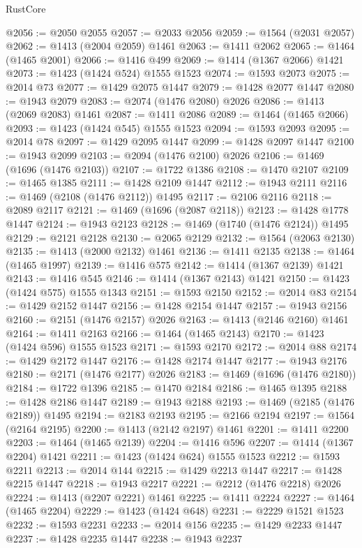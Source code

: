 \begin{lexlean}{RustCore}
\begin{coremodule}
@2056 := @2050 @2055
@2057 := @2033 @2056
@2059 := @1564 (@2031 @2057)
@2062 := @1413 (@2004 @2059) @1461
@2063 := @1411 @2062
@2065 := @1464 (@1465 @2001)
@2066 := @1416 @499
@2069 := @1414 (@1367 @2066) @1421
@2073 := @1423 (@1424 @524) @1555 @1523
@2074 := @1593 @2073
@2075 := @2014 @73
@2077 := @1429 @2075 @1447
@2079 := @1428 @2077 @1447
@2080 := @1943 @2079
@2083 := @2074 (@1476 @2080) @2026
@2086 := @1413 (@2069 @2083) @1461
@2087 := @1411 @2086
@2089 := @1464 (@1465 @2066)
@2093 := @1423 (@1424 @545) @1555 @1523
@2094 := @1593 @2093
@2095 := @2014 @78
@2097 := @1429 @2095 @1447
@2099 := @1428 @2097 @1447
@2100 := @1943 @2099
@2103 := @2094 (@1476 @2100) @2026
@2106 := @1469 (@1696 (@1476 @2103))
@2107 := @1722 @1386
@2108 := @1470 @2107
@2109 := @1465 @1385
@2111 := @1428 @2109 @1447
@2112 := @1943 @2111
@2116 := @1469 (@2108 (@1476 @2112)) @1495
@2117 := @2106 @2116
@2118 := @2089 @2117
@2121 := @1469 (@1696 (@2087 @2118))
@2123 := @1428 @1778 @1447
@2124 := @1943 @2123
@2128 := @1469 (@1740 (@1476 @2124)) @1495
@2129 := @2121 @2128
@2130 := @2065 @2129
@2132 := @1564 (@2063 @2130)
@2135 := @1413 (@2000 @2132) @1461
@2136 := @1411 @2135
@2138 := @1464 (@1465 @1997)
@2139 := @1416 @575
@2142 := @1414 (@1367 @2139) @1421
@2143 := @1416 @545
@2146 := @1414 (@1367 @2143) @1421
@2150 := @1423 (@1424 @575) @1555 @1343
@2151 := @1593 @2150
@2152 := @2014 @83
@2154 := @1429 @2152 @1447
@2156 := @1428 @2154 @1447
@2157 := @1943 @2156
@2160 := @2151 (@1476 @2157) @2026
@2163 := @1413 (@2146 @2160) @1461
@2164 := @1411 @2163
@2166 := @1464 (@1465 @2143)
@2170 := @1423 (@1424 @596) @1555 @1523
@2171 := @1593 @2170
@2172 := @2014 @88
@2174 := @1429 @2172 @1447
@2176 := @1428 @2174 @1447
@2177 := @1943 @2176
@2180 := @2171 (@1476 @2177) @2026
@2183 := @1469 (@1696 (@1476 @2180))
@2184 := @1722 @1396
@2185 := @1470 @2184
@2186 := @1465 @1395
@2188 := @1428 @2186 @1447
@2189 := @1943 @2188
@2193 := @1469 (@2185 (@1476 @2189)) @1495
@2194 := @2183 @2193
@2195 := @2166 @2194
@2197 := @1564 (@2164 @2195)
@2200 := @1413 (@2142 @2197) @1461
@2201 := @1411 @2200
@2203 := @1464 (@1465 @2139)
@2204 := @1416 @596
@2207 := @1414 (@1367 @2204) @1421
@2211 := @1423 (@1424 @624) @1555 @1523
@2212 := @1593 @2211
@2213 := @2014 @144
@2215 := @1429 @2213 @1447
@2217 := @1428 @2215 @1447
@2218 := @1943 @2217
@2221 := @2212 (@1476 @2218) @2026
@2224 := @1413 (@2207 @2221) @1461
@2225 := @1411 @2224
@2227 := @1464 (@1465 @2204)
@2229 := @1423 (@1424 @648)
@2231 := @2229 @1521 @1523
@2232 := @1593 @2231
@2233 := @2014 @156
@2235 := @1429 @2233 @1447
@2237 := @1428 @2235 @1447
@2238 := @1943 @2237

\end{coremodule}
\end{lexlean}
